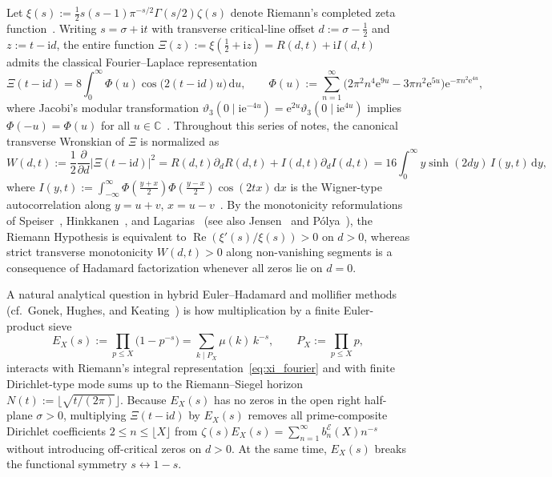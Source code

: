 \documentclass[11pt,reqno]{amsart}
\theoremstyle{plain}
\theoremstyle{definition}
\theoremstyle{remark}
\numberwithin{equation}{section}
\newcommand{\dd}{\,\mathrm{d}}
\newcommand{\ii}{\mathrm{i}}
\newcommand{\ee}{\mathrm{e}}
\DeclareMathOperator{\Reop}{Re}
\begin{document}
Let $\xi(s) := \frac{1}{2}s(s-1)\pi^{-s/2}\Gamma(s/2)\zeta(s)$ denote Riemann's completed zeta function~\cite{riemann1859,titchmarsh1986}. Writing $s = \sigma + \ii t$ with transverse critical-line offset $d := \sigma - \frac{1}{2}$ and $z := t - \ii d$, the entire function $\Xi(z) := \xi(\frac{1}{2} + \ii z) = R(d,t) + \ii I(d,t)$ admits the classical Fourier--Laplace representation
\begin{equation}\label{eq:xi_fourier}
\Xi(t - \ii d) = 8\int_0^{\infty} \Phi(u)\cos\!\bigl(2(t - \ii d)u\bigr)\dd u, \qquad \Phi(u) := \sum_{n=1}^{\infty} \bigl(2\pi^2 n^4 \ee^{9u} - 3\pi n^2 \ee^{5u}\bigr)\ee^{-\pi n^2 \ee^{4u}},
\end{equation}
where Jacobi's modular transformation $\vartheta_3(0 \mid \ii \ee^{-4u}) = \ee^{2u}\vartheta_3(0 \mid \ii \ee^{4u})$ implies $\Phi(-u) = \Phi(u)$ for all $u \in \mathbb{C}$~\cite{jacobi1829,riemann1859}. Throughout this series of notes, the canonical transverse Wronskian of $\Xi$ is normalized as
\begin{equation}\label{eq:canonical_wronskian}
W(d,t) := \frac{1}{2}\frac{\partial}{\partial d}\bigl\lvert\Xi(t - \ii d)\bigr\rvert^2 = R(d,t)\partial_d R(d,t) + I(d,t)\partial_d I(d,t) = 16\int_0^{\infty} y\sinh(2dy)\,I(y,t)\dd y,
\end{equation}
where $I(y,t) := \int_{-\infty}^{\infty} \Phi(\frac{y+x}{2})\Phi(\frac{y-x}{2})\cos(2tx)\dd x$ is the Wigner-type autocorrelation along $y = u + v$, $x = u - v$~\cite{wigner1932,hudson1974}. By the monotonicity reformulations of Speiser~\cite{speiser1934}, Hinkkanen~\cite{hinkkanen1997}, and Lagarias~\cite{lagarias1999} (see also Jensen~\cite{jensen1913} and P\'olya~\cite{polya1926}), the Riemann Hypothesis is equivalent to $\Reop(\xi'(s)/\xi(s)) > 0$ on $d > 0$, whereas strict transverse monotonicity $W(d,t) > 0$ along non-vanishing segments is a consequence of Hadamard factorization whenever all zeros lie on $d = 0$.

A natural analytical question in hybrid Euler--Hadamard and mollifier methods (cf.\ Gonek, Hughes, and Keating~\cite{gonek2007}) is how multiplication by a finite Euler-product sieve
\begin{equation}\label{eq:euler_sieve_def}
E_X(s) := \prod_{p \le X} \bigl(1 - p^{-s}\bigr) = \sum_{k \mid P_X} \mu(k)\,k^{-s}, \qquad P_X := \prod_{p \le X} p,
\end{equation}
interacts with Riemann's integral representation~\eqref{eq:xi_fourier} and with finite Dirichlet-type mode sums up to the Riemann--Siegel horizon $N(t) := \lfloor\sqrt{t/(2\pi)}\rfloor$. Because $E_X(s)$ has no zeros in the open right half-plane $\sigma > 0$, multiplying $\Xi(t - \ii d)$ by $E_X(s)$ removes all prime-composite Dirichlet coefficients $2 \le n \le \lfloor X\rfloor$ from $\zeta(s)E_X(s) = \sum_{n=1}^{\infty} b_n^{\mathcal{E}}(X)n^{-s}$ without introducing off-critical zeros on $d > 0$. At the same time, $E_X(s)$ breaks the functional symmetry $s \leftrightarrow 1 - s$.
\end{document}

